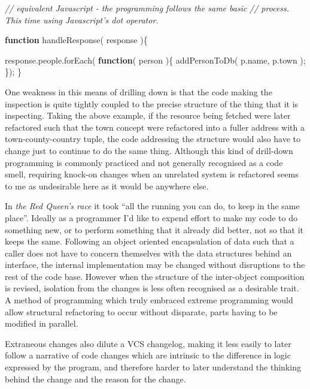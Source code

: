 \documentclass[]{article}
\newenvironment{Shaded}{}{}
\newcommand{\KeywordTok}[1]{\textcolor[rgb]{0.00,0.44,0.13}{\textbf{{#1}}}}
\newcommand{\CommentTok}[1]{\textcolor[rgb]{0.38,0.63,0.69}{\textit{{#1}}}}
\newcommand{\OtherTok}[1]{\textcolor[rgb]{0.00,0.44,0.13}{{#1}}}
\newcommand{\FunctionTok}[1]{\textcolor[rgb]{0.02,0.16,0.49}{{#1}}}
\newcommand{\NormalTok}[1]{{#1}}
\begin{document}
\begin{Shaded}
\begin{Highlighting}[]
\CommentTok{// equivalent Javascript - the programming follows the same basic}
\CommentTok{// process. This time using Javascript's dot operator.}

\KeywordTok{function} \FunctionTok{handleResponse}\NormalTok{( response )\{}

   \OtherTok{response}\NormalTok{.}\OtherTok{people}\NormalTok{.}\FunctionTok{forEach}\NormalTok{( }\KeywordTok{function}\NormalTok{( person )\{}
      \FunctionTok{addPersonToDb}\NormalTok{( }\OtherTok{p}\NormalTok{.}\FunctionTok{name}\NormalTok{, }\OtherTok{p}\NormalTok{.}\FunctionTok{town} \NormalTok{);}
   \NormalTok{\});}
\NormalTok{\}}
\end{Highlighting}
\end{Shaded}

One weakness in this means of drilling down is that the code making the
inspection is quite tightly coupled to the precise structure of the
thing that it is inspecting. Taking the above example, if the resource
being fetched were later refactored such that the town concept were
refactored into a fuller address with a town-county-country tuple, the
code addressing the structure would also have to change just to continue
to do the same thing. Although this kind of drill-down programming is
commonly practiced and not generally recognised as a code smell,
requiring knock-on changes when an unrelated system is refactored seems
to me as undesirable here as it would be anywhere else.

In \emph{the Red Queen's race} it took ``all the running you can do, to
keep in the same place''. Ideally as a programmer I'd like to expend
effort to make my code to do something new, or to perform something that
it already did better, not so that it keeps the same. Following an
object oriented encapsulation of data such that a caller does not have
to concern themselves with the data structures behind an interface, the
internal implementation may be changed without disruptions to the rest
of the code base. However when the structure of the inter-object
composition is revised, isolation from the changes is less often
recognised as a desirable trait. A method of programming which truly
embraced extreme programming would allow structural refactoring to occur
without disparate, parts having to be modified in parallel.

Extraneous changes also dilute a VCS changelog, making it less easily to
later follow a narrative of code changes which are intrinsic to the
difference in logic expressed by the program, and therefore harder to
later understand the thinking behind the change and the reason for the
change.
\end{document}
